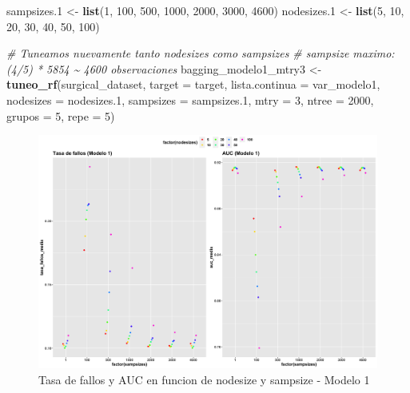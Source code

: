 \documentclass[
]{article}
\newenvironment{Shaded}{\begin{snugshade}}{\end{snugshade}}
\newcommand{\CommentTok}[1]{\textcolor[rgb]{0.56,0.35,0.01}{\textit{#1}}}
\newcommand{\DataTypeTok}[1]{\textcolor[rgb]{0.13,0.29,0.53}{#1}}
\newcommand{\DecValTok}[1]{\textcolor[rgb]{0.00,0.00,0.81}{#1}}
\newcommand{\FloatTok}[1]{\textcolor[rgb]{0.00,0.00,0.81}{#1}}
\newcommand{\KeywordTok}[1]{\textcolor[rgb]{0.13,0.29,0.53}{\textbf{#1}}}
\newcommand{\NormalTok}[1]{#1}
\newcommand{\StringTok}[1]{\textcolor[rgb]{0.31,0.60,0.02}{#1}}
\begin{document}
\begin{Shaded}
\begin{Highlighting}[]
\NormalTok{sampsizes}\FloatTok{.1}\NormalTok{ <{-}}\StringTok{ }\KeywordTok{list}\NormalTok{(}\DecValTok{1}\NormalTok{, }\DecValTok{100}\NormalTok{, }\DecValTok{500}\NormalTok{, }\DecValTok{1000}\NormalTok{, }\DecValTok{2000}\NormalTok{, }\DecValTok{3000}\NormalTok{, }\DecValTok{4600}\NormalTok{)}
\NormalTok{nodesizes}\FloatTok{.1}\NormalTok{ <{-}}\StringTok{ }\KeywordTok{list}\NormalTok{(}\DecValTok{5}\NormalTok{, }\DecValTok{10}\NormalTok{, }\DecValTok{20}\NormalTok{, }\DecValTok{30}\NormalTok{, }\DecValTok{40}\NormalTok{, }\DecValTok{50}\NormalTok{, }\DecValTok{100}\NormalTok{)}

\CommentTok{\# Tuneamos nuevamente tanto nodesizes como sampsizes}
\CommentTok{\# sampsize maximo: (4/5) * 5854 \textasciitilde{} 4600 observaciones}
\NormalTok{bagging\_modelo1\_mtry3 <{-}}\StringTok{  }\KeywordTok{tuneo\_rf}\NormalTok{(surgical\_dataset, }\DataTypeTok{target =}\NormalTok{ target,}
                                   \DataTypeTok{lista.continua =}\NormalTok{ var\_modelo1,}
                                   \DataTypeTok{nodesizes =}\NormalTok{ nodesizes}\FloatTok{.1}\NormalTok{,}
                                   \DataTypeTok{sampsizes =}\NormalTok{ sampsizes}\FloatTok{.1}\NormalTok{, }\DataTypeTok{mtry =} \DecValTok{3}\NormalTok{,}
                                   \DataTypeTok{ntree =} \DecValTok{2000}\NormalTok{, }\DataTypeTok{grupos =} \DecValTok{5}\NormalTok{, }\DataTypeTok{repe =} \DecValTok{5}\NormalTok{)}
\end{Highlighting}
\end{Shaded}

\begin{figure}[h!]

{\centering \includegraphics[width=0.99\linewidth,height=0.99\textheight,]{./charts/random_forest/04_comp_tasa_auc_modelo1} 

}

\caption{Tasa de fallos y AUC en funcion de nodesize y sampsize - Modelo 1}\label{fig:unnamed-chunk-91}
\end{figure}
\end{document}

